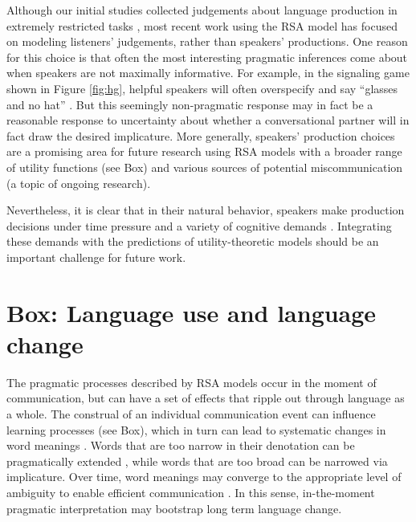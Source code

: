 \documentclass[]{elsarticle}
\begin{document}
Although our initial studies collected judgements about language
production in extremely restricted tasks \citep{frank2012}, most
recent work using the RSA model has focused on modeling listeners'
judgements, rather than speakers' productions. One reason for this
choice is that often the most interesting pragmatic inferences come
about when speakers are not maximally informative. For example, in the
signaling game shown in Figure \ref{fig:hg}, helpful speakers will often
overspecify and say ``glasses and no hat'' \citep{baumann2014}. But this seemingly non-pragmatic response may in fact be a
reasonable response to uncertainty about whether a conversational
partner will in fact draw the desired implicature.
%
More generally, speakers' production choices are a promising area for
future research using RSA models with a broader range of utility
functions (see Box) and various sources of potential miscommunication (a topic of ongoing research).


Nevertheless, it is clear that in their natural behavior, speakers make
production decisions under time pressure and a variety of cognitive
demands \citep{levelt1993}. Integrating these demands with the predictions of
utility-theoretic models should be an important challenge for future
work.

\section{Box: Language use and language
change}\label{box-language-use-and-language-change}

The pragmatic processes described by RSA models occur in the moment of
communication, but can have a set of effects that ripple out through
language as a whole. The construal of an individual communication event
can influence learning processes (see Box), which in turn can lead to
systematic changes in word meanings \citep{smith2013}.
Words that are too narrow in their denotation can be pragmatically
extended \citep{kao2014}, while words that are too
broad can be narrowed via implicature. Over time, word meanings may
converge to the appropriate level of ambiguity to enable efficient
communication \citep{piantadosi2012}.
In this sense, in-the-moment pragmatic interpretation may bootstrap long term language change.
\end{document}

